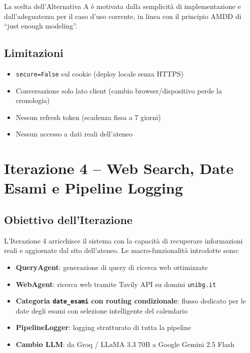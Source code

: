 \documentclass[a4paper,12pt]{report}
\begin{document}
La scelta dell'Alternativa A è motivata dalla semplicità di implementazione e dall'adeguatezza per il caso d'uso corrente, in linea con il principio AMDD di ``just enough modeling''.

\section{Limitazioni}

\begin{itemize}
    \item \texttt{secure=False} sul cookie (deploy locale senza HTTPS)
    \item Conversazione solo lato client (cambio browser/dispositivo perde la cronologia)
    \item Nessun refresh token (scadenza fissa a 7 giorni)
    \item Nessun accesso a dati reali dell'ateneo
\end{itemize}


\chapter{Iterazione 4 -- Web Search, Date Esami e Pipeline Logging}

\section{Obiettivo dell'Iterazione}

L'Iterazione 4 arricchisce il sistema con la capacità di recuperare informazioni reali e aggiornate dal sito dell'ateneo. Le macro-funzionalità introdotte sono:
\begin{itemize}
    \item \textbf{QueryAgent}: generazione di query di ricerca web ottimizzate
    \item \textbf{WebAgent}: ricerca web tramite Tavily API su domini \texttt{unibg.it}
    \item \textbf{Categoria \texttt{date\_esami} con routing condizionale}: flusso dedicato per le date degli esami con selezione intelligente del calendario
    \item \textbf{PipelineLogger}: logging strutturato di tutta la pipeline
    \item \textbf{Cambio LLM}: da Groq / LLaMA 3.3 70B a Google Gemini 2.5 Flash
\end{itemize}
\end{document}
